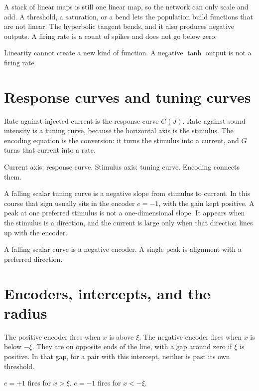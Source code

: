 \documentclass[11pt,letterpaper]{article}
\newcommand{\ans}[1]{\par\vspace{2pt}{\bfseries #1}\quad}
\begin{document}
\ans{2.}
A stack of linear maps is still one linear map, so the network can only scale and add. A threshold, a saturation, or a bend lets the population build functions that are not linear. The hyperbolic tangent bends, and it also produces negative outputs. A firing rate is a count of spikes and does not go below zero.
\begin{result}
Linearity cannot create a new kind of function. A negative \(\tanh\) output is not a firing rate.
\end{result}

\section{Response curves and tuning curves}

\ans{1.}
Rate against injected current is the response curve \(G(J)\). Rate against sound intensity is a tuning curve, because the horizontal axis is the stimulus. The encoding equation is the conversion: it turns the stimulus into a current, and \(G\) turns that current into a rate.
\begin{result}
Current axis: response curve. Stimulus axis: tuning curve. Encoding connects them.
\end{result}

\ans{2.}
A falling scalar tuning curve is a negative slope from stimulus to current. In this course that sign usually sits in the encoder \(e = -1\), with the gain kept positive. A peak at one preferred stimulus is not a one-dimensional slope. It appears when the stimulus is a direction, and the current is large only when that direction lines up with the encoder.
\begin{result}
A falling scalar curve is a negative encoder. A single peak is alignment with a preferred direction.
\end{result}

\section{Encoders, intercepts, and the radius}

\ans{1.}
The positive encoder fires when \(x\) is above \(\xi\). The negative encoder fires when \(x\) is below \(-\xi\). They are on opposite ends of the line, with a gap around zero if \(\xi\) is positive. In that gap, for a pair with this intercept, neither is past its own threshold.
\begin{result}
\(e = +1\) fires for \(x > \xi\). \(e = -1\) fires for \(x < -\xi\).
\end{result}
\end{document}

